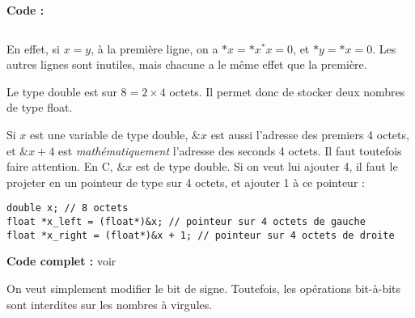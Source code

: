 \documentclass[../main.tex]{subfiles}
\begin{document}
\textbf{Code :} 

\inputminted{c}{solutions/part2/chapter2/inter_no_side_effect_3.c}
En effet, si $x = y$, à la première ligne, on a $*x = *x ^ *x = 0$, et $*y = *x = 0$. Les autres lignes sont inutiles, mais chacune a le même effet que la première.

Le type \textsf{double} est sur $8 = 2\times{4}$ octets. Il permet donc de stocker deux nombres de type \textsf{float}.

Si $x$ est une variable de type \textsf{double}, $\&x$ est aussi l'adresse des premiers 4 octets, et $\&x + 4$ est \textit{mathématiquement} l'adresse des seconds 4 octets. Il faut toutefois faire attention. En C, $\&x$ est de type \textsf{double}. Si on veut lui ajouter 4, il faut le projeter en un pointeur de type sur 4 octets, et ajouter 1 à ce pointeur :
\begin{verbatim}
double x; // 8 octets
float *x_left = (float*)&x; // pointeur sur 4 octets de gauche
float *x_right = (float*)&x + 1; // pointeur sur 4 octets de droite
\end{verbatim}
\textbf{Code complet :} voir 

On veut simplement modifier le bit de signe. Toutefois, les opérations bit-à-bits sont interdites sur les nombres à virgules.
\end{document}
